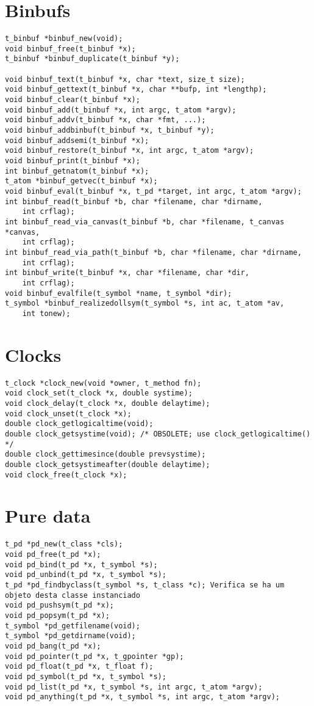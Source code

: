 \section{Binbufs}
\begin{lstlisting}
t_binbuf *binbuf_new(void);
void binbuf_free(t_binbuf *x);
t_binbuf *binbuf_duplicate(t_binbuf *y);

void binbuf_text(t_binbuf *x, char *text, size_t size);
void binbuf_gettext(t_binbuf *x, char **bufp, int *lengthp);
void binbuf_clear(t_binbuf *x);
void binbuf_add(t_binbuf *x, int argc, t_atom *argv);
void binbuf_addv(t_binbuf *x, char *fmt, ...);
void binbuf_addbinbuf(t_binbuf *x, t_binbuf *y);
void binbuf_addsemi(t_binbuf *x);
void binbuf_restore(t_binbuf *x, int argc, t_atom *argv);
void binbuf_print(t_binbuf *x);
int binbuf_getnatom(t_binbuf *x);
t_atom *binbuf_getvec(t_binbuf *x);
void binbuf_eval(t_binbuf *x, t_pd *target, int argc, t_atom *argv);
int binbuf_read(t_binbuf *b, char *filename, char *dirname,
    int crflag);
int binbuf_read_via_canvas(t_binbuf *b, char *filename, t_canvas *canvas,
    int crflag);
int binbuf_read_via_path(t_binbuf *b, char *filename, char *dirname,
    int crflag);
int binbuf_write(t_binbuf *x, char *filename, char *dir,
    int crflag);
void binbuf_evalfile(t_symbol *name, t_symbol *dir);
t_symbol *binbuf_realizedollsym(t_symbol *s, int ac, t_atom *av,
    int tonew);
\end{lstlisting}

\section{Clocks}
\begin{lstlisting}
t_clock *clock_new(void *owner, t_method fn);
void clock_set(t_clock *x, double systime);
void clock_delay(t_clock *x, double delaytime);
void clock_unset(t_clock *x);
double clock_getlogicaltime(void);
double clock_getsystime(void); /* OBSOLETE; use clock_getlogicaltime() */
double clock_gettimesince(double prevsystime);
double clock_getsystimeafter(double delaytime);
void clock_free(t_clock *x);
\end{lstlisting}

\section{Pure data}
\begin{lstlisting}
t_pd *pd_new(t_class *cls);
void pd_free(t_pd *x);
void pd_bind(t_pd *x, t_symbol *s);
void pd_unbind(t_pd *x, t_symbol *s);
t_pd *pd_findbyclass(t_symbol *s, t_class *c); Verifica se ha um objeto desta classe instanciado
void pd_pushsym(t_pd *x);
void pd_popsym(t_pd *x);
t_symbol *pd_getfilename(void);
t_symbol *pd_getdirname(void);
void pd_bang(t_pd *x);
void pd_pointer(t_pd *x, t_gpointer *gp);
void pd_float(t_pd *x, t_float f);
void pd_symbol(t_pd *x, t_symbol *s);
void pd_list(t_pd *x, t_symbol *s, int argc, t_atom *argv);
void pd_anything(t_pd *x, t_symbol *s, int argc, t_atom *argv);
\end{lstlisting}

